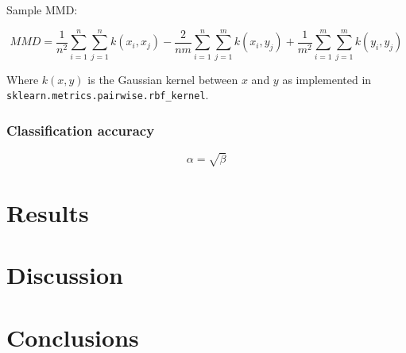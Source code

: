 \documentclass[titlepage]{article}
\begin{document}
Sample MMD:

\begin{equation}
	\label{mmd}
	MMD = \frac{1}{n^2}\sum_{i=1}^n{\sum_{j=1}^n{k(x_i, x_j)}} - \frac{2}{nm}\sum_{i=1}^n{\sum_{j=1}^m{k(x_i, y_j)}} + \frac{1}{m^2}\sum_{i=1}^m{\sum_{j=1}^m{k(y_i, y_j)}}
\end{equation}

Where $k(x, y)$ is the Gaussian kernel between $x$ and $y$ as implemented in \texttt{sklearn.metrics.pairwise.rbf\_kernel}.

\subsubsection{Classification accuracy}

\begin{equation}
	\label{simple_equation}
	\alpha = \sqrt{ \beta }
\end{equation}

\section{Results}

\section{Discussion}

\section{Conclusions}
\end{document}
